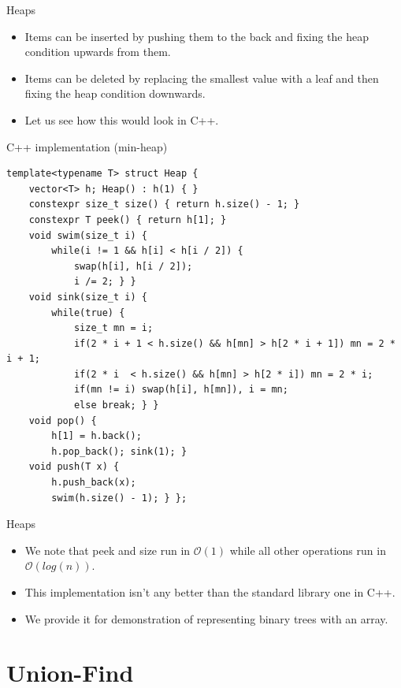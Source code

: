 \documentclass{beamer}
\begin{document}
\begin{frame}[plain]{Heaps}
    \begin{itemize}
        \item<1->Items can be inserted by pushing them to the back and fixing the heap condition upwards from them.
        \item<2-> Items can be deleted by replacing the smallest value with a leaf and then fixing the heap condition downwards.
        \item<3-> Let us see how this would look in C++.
    \end{itemize}
\end{frame}

\begin{frame}{C++ implementation (min-heap)}
    \scriptsize
    \begin{verbatim}
template<typename T> struct Heap {
    vector<T> h; Heap() : h(1) { }
    constexpr size_t size() { return h.size() - 1; }
    constexpr T peek() { return h[1]; }
    void swim(size_t i) {
        while(i != 1 && h[i] < h[i / 2]) {
            swap(h[i], h[i / 2]);
            i /= 2; } }
    void sink(size_t i) {
        while(true) {
            size_t mn = i;
            if(2 * i + 1 < h.size() && h[mn] > h[2 * i + 1]) mn = 2 * i + 1;
            if(2 * i  < h.size() && h[mn] > h[2 * i]) mn = 2 * i;
            if(mn != i) swap(h[i], h[mn]), i = mn;
            else break; } }
    void pop() {
        h[1] = h.back();
        h.pop_back(); sink(1); }
    void push(T x) {
        h.push_back(x);
        swim(h.size() - 1); } };
    \end{verbatim}
\end{frame}

\begin{frame}[plain]{Heaps}
    \begin{itemize}
        \item<1-> We note that peek and size run in $\mathcal{O}(1)$ while all other operations run in $\mathcal{O}(log(n))$.
        \item<2-> This implementation isn't any better than the standard library one in C++.
        \item<3-> We provide it for demonstration of representing binary trees with an array.
    \end{itemize}
\end{frame}

\section*{Union-Find}
\end{document}
